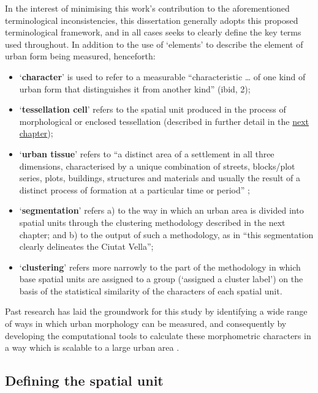 \documentclass[a4paper, nobind]{templates/ociamthesis}
\providecommand{\tightlist}{%
  \setlength{\itemsep}{0pt}\setlength{\parskip}{0pt}}
\begin{document}
In the interest of minimising this work's contribution to the aforementioned terminological inconsistencies, this dissertation generally adopts this proposed terminological framework, and in all cases seeks to clearly define the key terms used throughout. In addition to the use of `elements' to describe the element of urban form being measured, henceforth:

\begin{itemize}
\tightlist
\item
  `\textbf{character}' is used to refer to a measurable ``characteristic \ldots{} of one kind of urban form that distinguishes it from another kind'' (ibid, 2);
\item
  `\textbf{tessellation cell}' refers to the spatial unit produced in the process of morphological or enclosed tessellation (described in further detail in the \protect\hyperlink{base-spatial-units}{next chapter});
\item
  `\textbf{urban tissue}' refers to ``a distinct area of a settlement in all three dimensions, characterised by a unique combination of streets, blocks/plot series, plots, buildings, structures and materials and usually the result of a distinct process of formation at a particular time or period'' \citep[89]{kropf2017};
\item
  `\textbf{segmentation}' refers a) to the way in which an urban area is divided into spatial units through the clustering methodology described in the next chapter; and b) to the output of such a methodology, as in ``this segmentation clearly delineates the Ciutat Vella'';
\item
  `\textbf{clustering}' refers more narrowly to the part of the methodology in which base spatial units are assigned to a group (`assigned a cluster label') on the basis of the statistical similarity of the characters of each spatial unit.
\end{itemize}

Past research has laid the groundwork for this study by identifying a wide range of ways in which urban morphology can be measured, and consequently by developing the computational tools to calculate these morphometric characters in a way which is scalable to a large urban area \citep{fleischmannEvolutionUrbanPatterns2021}.

\hypertarget{spatial-unit}{%
\subsection{Defining the spatial unit}\label{spatial-unit}}
\end{document}
